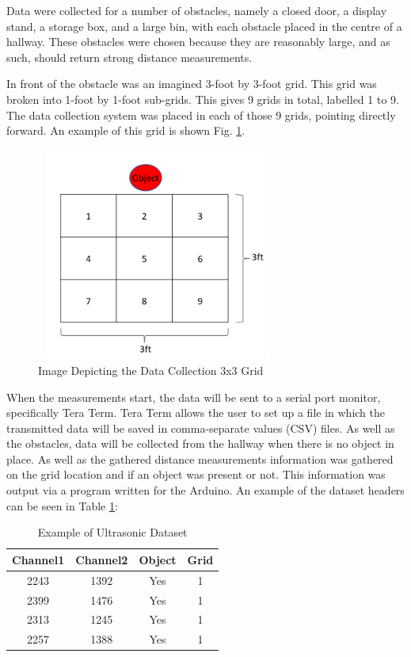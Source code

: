 \documentclass{svproc}
\begin{document}
Data were collected for a number of obstacles, namely a closed door, a display stand, a storage box, and a large bin, with each obstacle 
placed in the centre of a hallway. These obstacles were chosen because they are reasonably large, and as such, should return strong distance measurements. 

In front of the obstacle was an imagined 3-foot by 3-foot grid. This grid was broken into 1-foot by 1-foot sub-grids. This gives 9 grids 
in total, labelled 1 to 9. The data collection system was placed in each of those 9 grids, pointing directly forward. An example of this 
grid is shown Fig. \ref{fig:grid1}.

\begin{figure}[ht]
\includegraphics[width=8cm, height=7cm]{images/grid.png}
\centering
\caption{Image Depicting the Data Collection 3x3 Grid}
\label{fig:grid1}
\end{figure}

When the measurements start, the data will be sent to a serial port monitor, specifically Tera Term. Tera Term allows the user 
to set up a file in which the transmitted data will be saved in comma-separate values (CSV) files. As well as the obstacles, data will be 
collected from the hallway when there is no object in place. As well as the gathered distance measurements information was gathered on the grid 
location and if an object was present or not. This information was output via a program written for the Arduino. An example of the 
dataset headers can be seen in Table \ref{table:1}:

\begin{table}[ht]
\centering
\begin{tabular}{||c c c c||} 
 \hline
 Channel1 & Channel2 & Object & Grid \\ [0.5ex] 
 \hline\hline
 2243 & 1392 & Yes & 1 \\ 
 \hline
 2399 & 1476 & Yes & 1 \\
 \hline
 2313 & 1245 & Yes & 1 \\
 \hline
 2257 & 1388 & Yes & 1 \\ [1ex] 
 \hline
\end{tabular}
\caption{Example of Ultrasonic Dataset}
\label{table:1}
\end{table}
\end{document}
